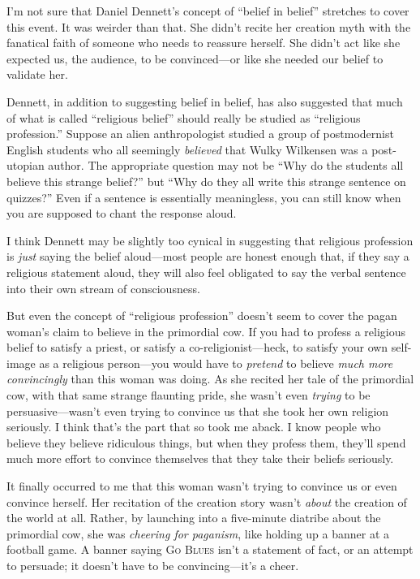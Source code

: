 {
 I'm not sure that Daniel Dennett's
concept of ``belief in belief''
stretches to cover this event. It was weirder than that. She
didn't recite her creation myth with the fanatical
faith of someone who needs to reassure herself. She
didn't act like she expected us, the audience, to be
convinced---or like she needed our belief to validate her.}

{
 Dennett, in addition to suggesting belief in belief, has also
suggested that much of what is called ``religious
belief'' should really be studied as
``religious profession.'' Suppose an
alien anthropologist studied a group of postmodernist English students
who all seemingly \textit{believed} that Wulky Wilkensen was a
post-utopian author. The appropriate question may not be
``Why do the students all believe this strange
belief?'' but ``Why do they all
write this strange sentence on quizzes?'' Even if a
sentence is essentially meaningless, you can still know when you are
supposed to chant the response aloud.}

{
 I think Dennett may be slightly too cynical in suggesting that
religious profession is \textit{just} saying the belief aloud---most
people are honest enough that, if they say a religious statement aloud,
they will also feel obligated to say the verbal sentence into their own
stream of consciousness.}

{
 But even the concept of ``religious
profession'' doesn't seem to cover
the pagan woman's claim to believe in the primordial
cow. If you had to profess a religious belief to satisfy a priest, or
satisfy a co-religionist---heck, to satisfy your own self-image as a
religious person---you would have to \textit{pretend} to believe
\textit{much more convincingly} than this woman was doing. As she
recited her tale of the primordial cow, with that same strange
flaunting pride, she wasn't even \textit{trying} to be
persuasive---wasn't even trying to convince us that she
took her own religion seriously. I think that's the
part that so took me aback. I know people who believe they believe
ridiculous things, but when they profess them, they'll
spend much more effort to convince themselves that they take their
beliefs seriously.}

{
 It finally occurred to me that this woman wasn't
trying to convince us or even convince herself. Her recitation of the
creation story wasn't \textit{about} the creation of
the world at all. Rather, by launching into a five-minute diatribe
about the primordial cow, she was \textit{cheering for paganism}, like
holding up a banner at a football game. A banner saying \textsc{Go Blues}
isn't a statement of fact, or an attempt to persuade;
it doesn't have to be convincing---it's
a cheer.}

